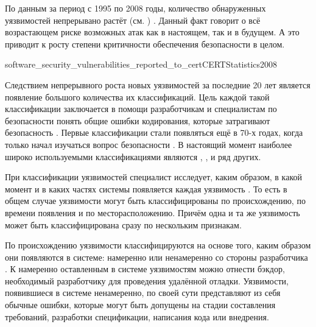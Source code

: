 \Sentence
По данным  за период с 1995 по 2008 годы, количество обнаруженных уязвимостей 
 непрерывано растёт (см. 
) 
. 
\Sentence
Данный факт говорит о всё возрастающем риске возможных атак как в настоящем, так и в будущем. 
\Sentence
А это приводит к росту степени критичности обеспечения безопасности  
в целом. 

	{software_security_vulnerabilities_reported_to_cert}{CERTStatistics2008}

\Sentence
Следствием непрерывного роста новых уязвимостей за последние 20 лет является появление большого 
количества их классификаций. 
\Sentence
Цель каждой такой классификации заключается в помощи разработчикам  и 
специалистам по безопасности  понять общие ошибки кодирования, которые 
затрагивают безопасность . 
\Sentence
Первые классификации стали появляться ещё в 70-х годах, когда только начал изучаться вопрос 
безопасности  .  
\Sentence
В настоящий момент наиболее широко используемыми классификациями являются  
,  , 
  и 
ряд других.


\Sentence
При классификации уязвимостей  специалист исследует, каким образом, в какой 
момент и в каких частях системы появляется каждая уязвимость  
 . 
\Sentence
То есть в общем случае уязвимости могут быть классифицированы по происхождению, по времени 
появления и по месторасположению. 
\Sentence
Причём одна и та же уязвимость может быть классифицирована сразу по нескольким признакам. 

\Sentence
По происхождению уязвимости классифицируются на основе того, каким образом они появляются в системе: 
намеренно или ненамеренно со стороны разработчика . 
\Sentence
К намеренно оставленным в системе уязвимостям можно отнести бэкдор, необходимый разработчику для 
проведения удалённой отладки. 
\Sentence
Уязвимости, появившиеся в системе ненамеренно, по своей сути представляют из себя обычные ошибки, 
которые могут быть допущены на стадии составления требований, разработки спецификации, написания 
кода или внедрения. 

